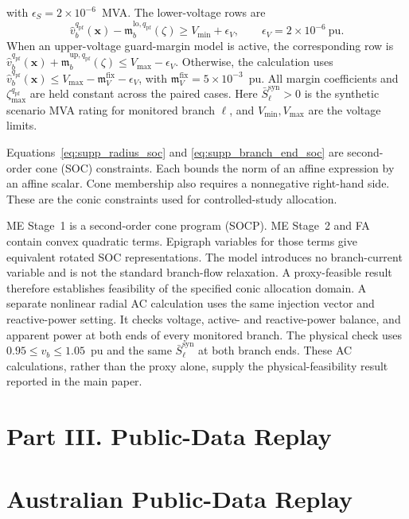 \documentclass[11pt]{article}
\begin{document}
with $\epsilon_S=2\times10^{-6}$~MVA. The lower-voltage rows are
\begin{equation}
\widehat v_b^{q_{\mathrm{pf}}}(\mathbf x)
-\mathfrak m_b^{\mathrm{lo},q_{\mathrm{pf}}}(\zeta)
\ge V_{\min}+\epsilon_V,
\qquad \epsilon_V=2\times10^{-6}~\mathrm{pu}.
\label{eq:supp_voltage_lower_proxy}
\end{equation}
When an upper-voltage guard-margin model is active, the corresponding row is
$\widehat v_b^{q_{\mathrm{pf}}}(\mathbf x)
+\mathfrak m_b^{\mathrm{up},q_{\mathrm{pf}}}(\zeta)
\le V_{\max}-\epsilon_V$. Otherwise, the calculation uses
$\widehat v_b^{q_{\mathrm{pf}}}(\mathbf x)
\le V_{\max}-\mathfrak m_V^{\mathrm{fix}}-\epsilon_V$, with
$\mathfrak m_V^{\mathrm{fix}}=5\times10^{-3}$~pu. All margin coefficients and
$\zeta_{\max}^{q_{\mathrm{pf}}}$ are held constant across the paired cases. Here
$\bar S_{\ell}^{\mathrm{syn}}>0$ is the synthetic scenario MVA rating for monitored
branch $\ell$, and $V_{\min},V_{\max}$ are the voltage limits.

Equations~\eqref{eq:supp_radius_soc} and
\eqref{eq:supp_branch_end_soc} are second-order cone (SOC) constraints. Each
bounds the norm of an affine expression by an affine scalar. Cone membership
also requires a nonnegative right-hand side. These are the conic constraints
used for controlled-study allocation.

ME Stage~1 is a second-order cone program (SOCP). ME Stage~2 and
FA contain convex quadratic terms. Epigraph variables for those terms give
equivalent rotated SOC representations. The model introduces no branch-current
variable and is not the standard branch-flow relaxation. A proxy-feasible result
therefore establishes feasibility of the specified conic allocation domain. A
separate nonlinear radial AC calculation uses the same injection vector and
reactive-power setting. It checks voltage, active- and reactive-power balance,
and apparent power at both ends of every monitored branch. The physical check uses
$0.95\le v_b\le1.05$~pu and the same $\bar S_{\ell}^{\mathrm{syn}}$ at both
branch ends. These AC calculations, rather than the proxy alone, supply the
physical-feasibility result reported in the main paper.

\section*{Part III. Public-Data Replay}

\section{Australian Public-Data Replay}
\label{supp:australian_replay}
\end{document}
